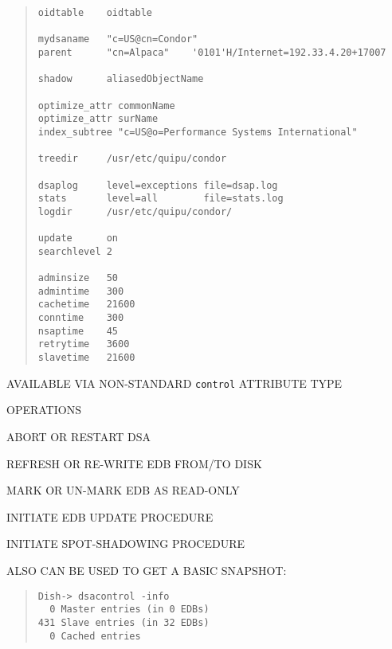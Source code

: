 \begin{bwslide}

\begin{quote}\smaller\begin{verbatim}
oidtable    oidtable

mydsaname   "c=US@cn=Condor"
parent      "cn=Alpaca"    '0101'H/Internet=192.33.4.20+17007

shadow      aliasedObjectName

optimize_attr commonName
optimize_attr surName
index_subtree "c=US@o=Performance Systems International"

treedir     /usr/etc/quipu/condor

dsaplog     level=exceptions file=dsap.log
stats       level=all        file=stats.log
logdir      /usr/etc/quipu/condor/

update      on
searchlevel 2

adminsize   50
admintime   300
cachetime   21600
conntime    300
nsaptime    45
retrytime   3600
slavetime   21600
\end{verbatim}\end{quote}
\end{bwslide}


\begin{bwslide}

\begin{nrtc}
\item	AVAILABLE VIA NON-STANDARD \verb"control" ATTRIBUTE TYPE

\item	OPERATIONS
    \begin{nrtc}
    \item	ABORT OR RESTART DSA

    \item	REFRESH OR RE-WRITE EDB FROM/TO DISK

    \item	MARK OR UN-MARK EDB AS READ-ONLY

    \item	INITIATE EDB UPDATE PROCEDURE

    \item	INITIATE SPOT-SHADOWING PROCEDURE
    \end{nrtc}

\item	ALSO CAN BE USED TO GET A BASIC SNAPSHOT:
\begin{quote}\small\begin{verbatim}
Dish-> dsacontrol -info
  0 Master entries (in 0 EDBs)
431 Slave entries (in 32 EDBs)
  0 Cached entries
\end{verbatim}\end{quote}
\end{nrtc}
\end{bwslide}


